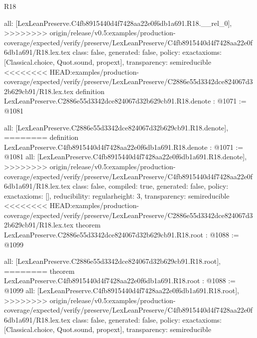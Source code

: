 \begin{lexlean}{R18}
\begin{coremodule}
{{{{{{{{{{{{  all: [LexLeanPreserve.C4fb8915440d4f7428aa22e0f6db1a691.R18.__rel_0],
>>>>>>>> origin/release/v0.5:examples/production-coverage/expected/verify/preserve/LexLeanPreserve/C4fb8915440d4f7428aa22e0f6db1a691/R18.lex.tex
  class: false,
  generated: false,
  policy: exact{axioms: [Classical.choice, Quot.sound, propext]},
  transparency: semireducible
}
<<<<<<<< HEAD:examples/production-coverage/expected/verify/preserve/LexLeanPreserve/C2886e55d3342dce824067d32b629cb91/R18.lex.tex
definition LexLeanPreserve.C2886e55d3342dce824067d32b629cb91.R18.denote : @1071 := @1081 {
  all: [LexLeanPreserve.C2886e55d3342dce824067d32b629cb91.R18.denote],
========
definition LexLeanPreserve.C4fb8915440d4f7428aa22e0f6db1a691.R18.denote : @1071 := @1081 {
  all: [LexLeanPreserve.C4fb8915440d4f7428aa22e0f6db1a691.R18.denote],
>>>>>>>> origin/release/v0.5:examples/production-coverage/expected/verify/preserve/LexLeanPreserve/C4fb8915440d4f7428aa22e0f6db1a691/R18.lex.tex
  class: false,
  compiled: true,
  generated: false,
  policy: exact{axioms: []},
  reducibility: regular{height: 3},
  transparency: semireducible
}
<<<<<<<< HEAD:examples/production-coverage/expected/verify/preserve/LexLeanPreserve/C2886e55d3342dce824067d32b629cb91/R18.lex.tex
theorem LexLeanPreserve.C2886e55d3342dce824067d32b629cb91.R18.root : @1088 := @1099 {
  all: [LexLeanPreserve.C2886e55d3342dce824067d32b629cb91.R18.root],
========
theorem LexLeanPreserve.C4fb8915440d4f7428aa22e0f6db1a691.R18.root : @1088 := @1099 {
  all: [LexLeanPreserve.C4fb8915440d4f7428aa22e0f6db1a691.R18.root],
>>>>>>>> origin/release/v0.5:examples/production-coverage/expected/verify/preserve/LexLeanPreserve/C4fb8915440d4f7428aa22e0f6db1a691/R18.lex.tex
  class: false,
  generated: false,
  policy: exact{axioms: [Classical.choice, Quot.sound, propext]},
  transparency: semireducible
}

}}}}}}}}}}}}}
\end{coremodule}
\end{lexlean}
